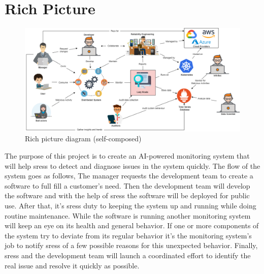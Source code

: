 \section{Rich Picture}

\begin{figure}[H]
    \includegraphics[width=16cm]{assets/requirement-specification/rich-picture.png}
    \caption{Rich picture diagram (self-composed)}
    \label{fig:rich-picture}
\end{figure}

The purpose of this project is to create an AI-powered monitoring system that will help \acp{sres} to detect and diagnose issues in the system quickly. The flow of the system goes as follows, The manager requests the development team to create a software to full fill a customer's need. Then the development team will develop the software and with the help of \acp{sres} the software will be deployed for public use. After that, it's \acp{sres} duty to keeping the system up and running while doing routine maintenance. While the software is running another monitoring system will keep an eye on its health and general behavior. If one or more components of the system try to deviate from its regular behavior it's the monitoring system's job to notify \acp{sres} of a few possible reasons for this unexpected behavior. Finally, \acp{sres} and the development team will launch a coordinated effort to identify the real issue and resolve it quickly as possible. 